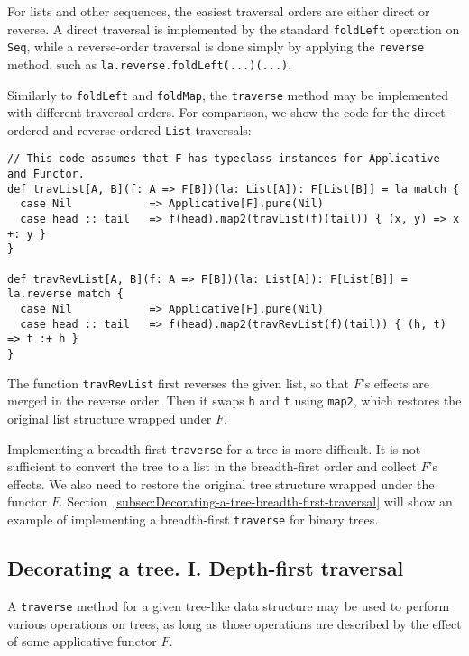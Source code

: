 For lists and other sequences, the easiest traversal orders are either
direct or reverse. A direct traversal is implemented by the standard
\lstinline!foldLeft! operation on \lstinline!Seq!, while a reverse-order
traversal is done simply by applying the \lstinline!reverse! method,
such as \lstinline!la.reverse.foldLeft(...)(...)!.

Similarly to \lstinline!foldLeft! and \lstinline!foldMap!, the \lstinline!traverse!
method may be implemented with different traversal orders. For comparison,
we show the code for the direct-ordered and reverse-ordered \lstinline!List!
traversals:
\begin{lstlisting}
// This code assumes that F has typeclass instances for Applicative and Functor.
def travList[A, B](f: A => F[B])(la: List[A]): F[List[B]] = la match {
  case Nil            => Applicative[F].pure(Nil)
  case head :: tail   => f(head).map2(travList(f)(tail)) { (x, y) => x +: y }
}

def travRevList[A, B](f: A => F[B])(la: List[A]): F[List[B]] = la.reverse match {
  case Nil            => Applicative[F].pure(Nil)
  case head :: tail   => f(head).map2(travRevList(f)(tail)) { (h, t) => t :+ h }
}
\end{lstlisting}
The function \lstinline!travRevList! first reverses the given list,
so that $F$\textsf{'}s effects are merged in the reverse order. Then it swaps
\lstinline!h! and \lstinline!t! using \lstinline!map2!, which restores
the original list structure wrapped under $F$.

Implementing a breadth-first \lstinline!traverse! for a tree is more
difficult. It is not sufficient to convert the tree to a list in the
breadth-first order and collect $F$\textsf{'}s effects. We also need to restore
the original tree structure wrapped under the functor $F$. Section~\ref{subsec:Decorating-a-tree-breadth-first-traversal}
will show an example of implementing a breadth-first \lstinline!traverse!
for binary trees.

\subsection{Decorating a tree. I. Depth-first traversal\label{subsec:Decorating-a-tree1}}

A \lstinline!traverse! method for a given tree-like data structure
may be used to perform various operations on trees, as long as those
operations are described by the effect of some applicative functor
$F$. 

